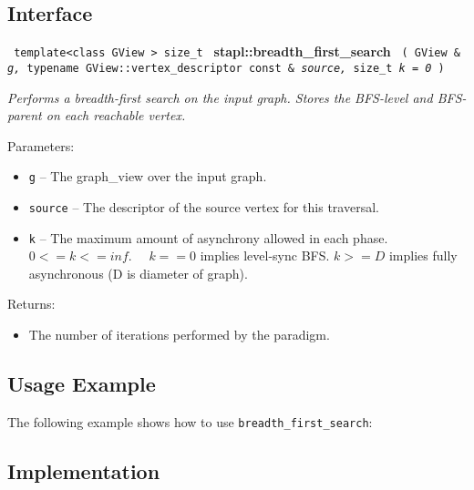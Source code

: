 \subsection{Interface} \label{sec-br-first-alg-inter}

\noindent
\texttt{%
template<class GView >
\newline
size\_t 
}
\newline
\textbf{stapl::breadth\_first\_search}%
\newline
\texttt{%
(   
GView \&    
\textit{g,}%
typename 
GView::vertex\_descriptor const \& 
\textit{source,}%
size\_t    
\textit{k = 0}%
)     
}
\vspace{0.4cm}

\textit{
Performs a breadth-first search on the input graph. 
Stores the BFS-level and BFS-parent on each reachable vertex.
}
\vspace{0.4cm}

Parameters:
\begin{itemize}
\item
\texttt{g} --
The graph\_view over the input graph.
\item
\texttt{source} --
The descriptor of the source vertex for this traversal.
\item
\texttt{k} --
The maximum amount of asynchrony allowed in each phase. $0 <= k <= inf.$ \ \ $k == 0$ implies level-sync BFS. $k >= D$ implies fully asynchronous (D is diameter of graph).
\end{itemize}

Returns:
\begin{itemize}
\item
The number of iterations performed by the paradigm. 
\end{itemize}

\subsection{Usage Example} \label{sec-br-first-alg-use}

The following example shows how to use 
\texttt{breadth\_first\_search}:


\subsection{Implementation} \label{sec-br-first-alg-impl}

